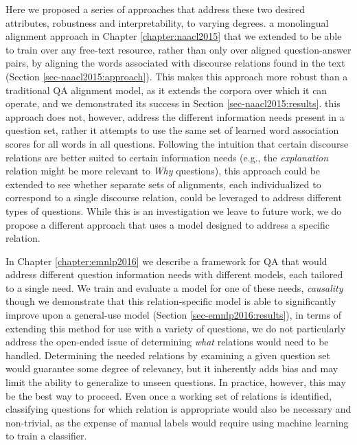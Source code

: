 Here we proposed a series of approaches that address these two desired attributes, robustness and interpretability, to varying degrees.   a monolingual alignment approach in Chapter \ref{chapter:naacl2015} that we extended to be able to train over any free-text resource, rather than only over aligned question-answer pairs, by aligning the words associated with discourse relations found in the text (Section \ref{sec-naacl2015:approach}).  This makes this approach more robust than a traditional QA alignment model, as it extends the corpora over which it can operate, and we demonstrated its success in Section \ref{sec-naacl2015:results}.   this approach does not, however, address the different information needs present in a question set, rather it attempts to use the same set of learned word association scores for all words in all questions.  Following the intuition that certain discourse relations are better suited to certain information needs (e.g., the \textit{explanation} relation might be more relevant to \textit{Why} questions), this approach could be extended to see whether separate sets of alignments, each individualized to correspond to a single discourse relation, could be leveraged to address different types of questions.   While this is an investigation we leave to future work, we do propose a different approach that uses a model designed to address a specific relation.

In Chapter \ref{chapter:emnlp2016} we describe a framework for QA that would address different question information needs with different models, each tailored to a single need.  We train and evaluate a model for one of these needs, \textit{causality} though we demonstrate that this relation-specific model is able to significantly improve upon a general-use model (Section \ref{sec-emnlp2016:results}), in terms of extending this method for use with a variety of questions, we do not particularly address the open-ended issue of determining \textit{what} relations would need to be handled.  Determining the needed relations by examining a given question set would guarantee some degree of relevancy, but it inherently adds bias and may limit the ability to generalize to unseen questions.  In practice, however, this may be the best way to proceed.  Even once a working set of relations is identified, classifying questions for which relation is appropriate would also be necessary and non-trivial, as the expense of manual labels would require using machine learning to train a classifier.
  
